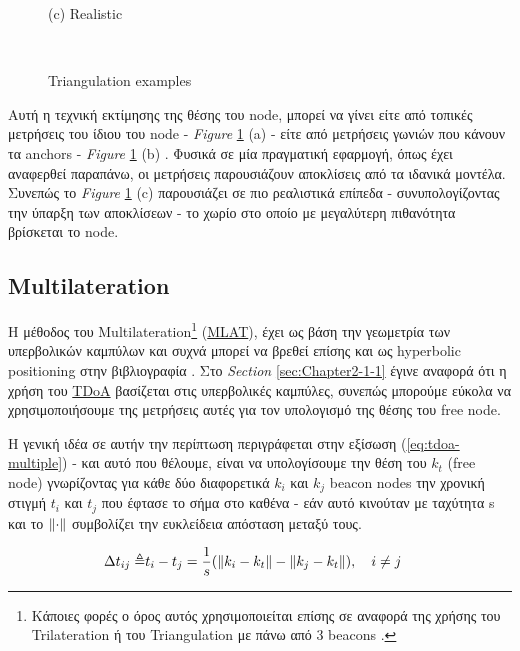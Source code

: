 \begin{figure} [H]
\begin{minipage}{.4\textwidth}
		{(c) Realistic}
	\end{minipage}
	\hfill \break \\
	\decoRule
	\caption[Triangulation examples]{Triangulation examples}
	\label{fig:Triangulation-examples}
\end{figure}

Αυτή η τεχνική εκτίμησης της θέσης του node, μπορεί να γίνει είτε από τοπικές μετρήσεις του ίδιου του node -
\emph{Figure} \ref{fig:Triangulation-examples} (a) - είτε από μετρήσεις γωνιών που κάνουν τα anchors - \emph{Figure} \ref{fig:Triangulation-examples} (b)
\cite{wsn-Localization-systems}. Φυσικά σε μία πραγματική εφαρμογή, όπως έχει αναφερθεί παραπάνω, οι μετρήσεις παρουσιάζουν αποκλίσεις 
από τα ιδανικά μοντέλα. Συνεπώς το \emph{Figure} \ref{fig:Triangulation-examples} (c) παρουσιάζει σε πιο ρεαλιστικά επίπεδα - συνυπολογίζοντας την ύπαρξη 
των αποκλίσεων - 
το χωρίο στο οποίο με μεγαλύτερη πιθανότητα βρίσκεται το node.

\subsection{Multilateration} \label{sec:Multilateration}
Η μέθοδος του Multilateration\footnote{Κάποιες φορές ο όρος αυτός χρησιμοποιείται επίσης σε αναφορά της χρήσης του Trilateration ή του Triangulation με πάνω από 3 beacons \cite{wsn-Localization-systems} \cite{triangulation-simple-equation}.} (\hyperref[abbr:MLAT]{MLAT}), 
έχει ως βάση την γεωμετρία των υπερβολικών καμπύλων και συχνά μπορεί να βρεθεί επίσης και ως hyperbolic positioning 
στην βιβλιογραφία \cite{multilateration-def} \cite{triangulation-trilateration-multilateration} \cite{wikipedia-multilateration}. Στο \emph{Section} \ref{sec:Chapter2-1-1} 
έγινε αναφορά ότι η χρήση του \hyperref[abbr:TDoA]{TDoA} βασίζεται στις υπερβολικές καμπύλες, συνεπώς μπορούμε εύκολα να χρησιμοποιήσουμε
της μετρήσεις αυτές για τον υπολογισμό της θέσης του free node.

Η γενική ιδέα σε αυτήν την περίπτωση περιγράφεται στην εξίσωση (\ref{eq:tdoa-multiple}) \cite{wsn-Localization-techniques} \cite{simple-tdoa} - και αυτό που 
θέλουμε, είναι να υπολογίσουμε την θέση του $k_t$ (free node) γνωρίζοντας για κάθε δύο διαφορετικά $k_i$ και $k_j$ beacon nodes
την χρονική στιγμή $t_i$ και $t_j$ που έφτασε το σήμα στο καθένα - εάν αυτό κινούταν με ταχύτητα s και το $\left\lVert\cdot\right\rVert$ συμβολίζει την ευκλείδεια
απόσταση μεταξύ τους.

\begin{align}
	\Delta t_{ij} \triangleq & t_i - t_j = \frac{1}{s} (\left\lVert k_i - k_t\right\rVert - \left\lVert k_j - k_t\right\rVert), \quad i \neq j\label{eq:tdoa-multiple}
\end{align}

